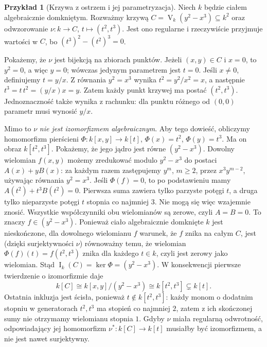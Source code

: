 \documentclass[11pt,a4paper,openany]{report}
\numberwithin{equation}{section}
\theoremstyle{plain}
\theoremstyle{definition}
\newtheorem{przyklad}[twierdzenie]{Przykład}
\theoremstyle{remark}
\newcommand{\V}{\operatorname V}
\newcommand{\I}{\operatorname I}
\newcommand{\kerf}{\operatorname{ker}}
\begin{document}
\begin{przyklad}[Krzywa z ostrzem i jej parametryzacja]
\label{pr:cusp}
Niech $k$ będzie ciałem algebraicznie domkniętym.
Rozważmy krzywą
$C=\V_k(y^2-x^3)\subseteq k^2$ oraz odwzorowanie
$\nu:k\to C$, $t\mapsto(t^2,t^3)$.
Jest ono regularne i rzeczywiście przyjmuje wartości w $C$,
bo $(t^3)^2-(t^2)^3=0$.

Pokażemy, że $\nu$ jest bijekcją na zbiorach punktów.
Jeżeli $(x,y)\in C$ i $x=0$, to $y^2=0$, a więc $y=0$;
wówczas jedynym parametrem jest $t=0$.
Jeśli $x\ne0$, definiujemy $t=y/x$. Z równania $y^2=x^3$
wynika $t^2=y^2/x^2=x$, a następnie
$t^3=t\,t^2=(y/x)x=y$. Zatem każdy punkt krzywej ma postać
$(t^2,t^3)$. Jednoznaczność także wynika z rachunku:
dla punktu różnego od $(0,0)$ parametr musi wynosić $y/x$.

Mimo to $\nu$ \emph{nie jest izomorfizmem algebraicznym}.
Aby tego dowieść, obliczymy homomorfizm pierścieni
$\Phi:k[x,y]\to k[t]$, $\Phi(x)=t^2$, $\Phi(y)=t^3$.
Ma on obraz $k[t^2,t^3]$.
Pokażemy, że jego jądro jest równe $(y^2-x^3)$.
Dowolny wielomian $f(x,y)$ możemy zredukować modulo
$y^2-x^3$ do postaci $A(x)+yB(x)$:
za każdym razem zastępujemy $y^m$, $m\ge2$, przez
$x^3y^{m-2}$, używając równania $y^2=x^3$.
Jeśli $\Phi(f)=0$, to po podstawieniu mamy
$A(t^2)+t^3B(t^2)=0$.
Pierwsza suma zawiera tylko parzyste potęgi $t$,
a druga tylko nieparzyste potęgi $t$ stopnia co najmniej $3$.
Nie mogą się więc wzajemnie znosić. Wszystkie współczynniki
obu wielomianów są zerowe, czyli $A=B=0$.
To znaczy $f\in(y^2-x^3)$.
Ponieważ ciało algebraicznie domknięte $k$ jest nieskończone,
dla dowolnego wielomianu $f$ warunek, że $f$ znika na
całym $C$, jest (dzięki surjektywności $\nu$) równoważny temu,
że wielomian $\Phi(f)(t)=f(t^2,t^3)$ znika dla każdego
$t\in k$, czyli jest zerowy jako wielomian.
Stąd $\I_k(C)=\kerf\Phi=(y^2-x^3)$.
W konsekwencji pierwsze twierdzenie o izomorfizmie daje
\[
k[C]\cong k[x,y]/(y^2-x^3)\cong k[t^2,t^3]\subsetneq k[t].
\]
Ostatnia inkluzja jest ścisła, ponieważ $t\notin k[t^2,t^3]$:
każdy monom o dodatnim stopniu w generatorach $t^2,t^3$
ma stopień co najmniej $2$, zatem z ich skończonej sumy
nie otrzymamy wielomianu stopnia $1$.
Gdyby $\nu$ miała regularną odwrotność, odpowiadający jej
homomorfizm $\nu^*:k[C]\to k[t]$ musiałby być izomorfizmem,
a nie jest nawet surjektywny.
\end{przyklad}
\end{document}
